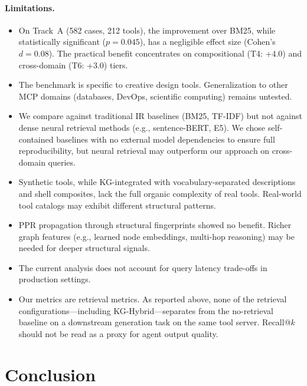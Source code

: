 \documentclass[11pt,a4paper]{article}
\begin{document}
\paragraph{Limitations.}
\begin{itemize}
  \item On Track~A (582 cases, 212 tools), the improvement over BM25, while statistically significant ($p=0.045$), has a negligible effect size (Cohen's $d=0.08$). The practical benefit concentrates on compositional (T4: +4.0) and cross-domain (T6: +3.0) tiers.
  \item The benchmark is specific to creative design tools. Generalization to other MCP domains (databases, DevOps, scientific computing) remains untested.
  \item We compare against traditional IR baselines (BM25, TF-IDF) but not against dense neural retrieval methods (e.g., sentence-BERT, E5). We chose self-contained baselines with no external model dependencies to ensure full reproducibility, but neural retrieval may outperform our approach on cross-domain queries.
  \item Synthetic tools, while KG-integrated with vocabulary-separated descriptions and shell composites, lack the full organic complexity of real tools. Real-world tool catalogs may exhibit different structural patterns.
  \item PPR propagation through structural fingerprints showed no benefit. Richer graph features (e.g., learned node embeddings, multi-hop reasoning) may be needed for deeper structural signals.
  \item The current analysis does not account for query latency trade-offs in production settings.
  \item Our metrics are retrieval metrics. As reported above, none of the retrieval configurations---including KG-Hybrid---separates from the no-retrieval baseline on a downstream generation task on the same tool server. Recall@$k$ should not be read as a proxy for agent output quality.
\end{itemize}

\section{Conclusion}
\label{sec:conclusion}
\end{document}
